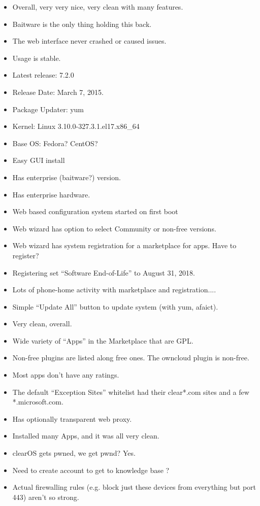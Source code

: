\begin{itemize}
 \item Overall, very very nice, very clean with many features.
 \item Baitware is the only thing holding this back.
 \item The web interface never crashed or caused issues.
 \item Usage is stable.
 \item Latest release: 7.2.0
 \item Release Date: March 7, 2015.
 \item Package Updater: yum
 \item Kernel: Linux 3.10.0-327.3.1.el17.x86\_64
 \item Base OS: Fedora? CentOS?
 \item Easy GUI install
 \item Has enterprise (baitware?) version.
 \item Has enterprise hardware.
 \item Web based configuration system started on first boot
 \item Web wizard has option to select Community or non-free versions.
 \item Web wizard has system registration for a marketplace for apps. Have to register?
 \item Registering set ``Software End-of-Life'' to August 31, 2018.
 \item Lots of phone-home activity with marketplace and registration....
 \item Simple ``Update All'' button to update system (with yum, afaict).
 \item Very clean, overall.
 \item Wide variety of ``Apps'' in the Marketplace that are GPL.
 \item Non-free plugins are listed along free ones. The owncloud plugin is non-free.
 \item Most apps don't have any ratings.
 \item The default ``Exception Sites'' whitelist had their clear*.com sites and a few *.microsoft.com.
 \item Has optionally transparent web proxy.
 \item Installed many Apps, and it was all very clean.
 \item clearOS gets pwned, we get pwnd? Yes.
 \item Need to create account to get to knowledge base ?
 \item Actual firewalling rules (e.g. block just these devices from everything but port 443) aren't so strong.

\end{itemize}
